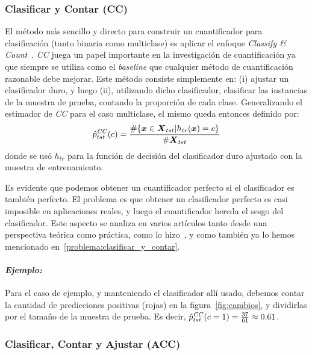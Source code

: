 \subsubsection{Clasificar y Contar (CC)}\label{puntual:cc}

El método más sencillo y directo para construir un cuantificador para
clasificación (tanto binaria como multiclase) es aplicar el enfoque {\it
Classify \& Count\/}~\cite{forman2005counting}. {\it CC\/} juega un papel
importante en la investigación de cuantificación ya que siempre se utiliza como
el {\it baseline\/} que cualquier método de cuantificación razonable debe
mejorar. Este método consiste simplemente en: (i) ajustar un clasificador duro,
y luego (ii), utilizando dicho clasificador, clasificar las instancias de la
muestra de prueba, contando la proporción de cada clase. Generalizando el
estimador de {\it CC\/} para el caso multiclase, el mismo queda entonces
definido por:
\begin{equation}
    \hat p^{\it CC\/}_{tst}(c) = \frac{\#\{\boldsymbol{x} \in \boldsymbol{X}_{tst}|h_{tr}(\boldsymbol{x})=c\}}{\#\boldsymbol{X}_{tst}}\label{ecuacion:cc}
\end{equation}
donde se usó $h_{tr}$ para la función de decisión del clasificador duro ajustado
con la muestra de entrenamiento.

Es evidente que podemos obtener un cuantificador perfecto si el clasificador es
también perfecto. El problema es que obtener un clasificador perfecto es casi
imposible en aplicaciones reales, y luego el cuantificador hereda el sesgo del
clasificador. Este aspecto se analiza en varios artículos tanto desde una
perspectiva teórica como práctica, como lo hizo~\citet{forman2008quantifying}, y
como también ya lo hemos mencionado en~\ref{problema:clasificar_y_contar}.

\paragraph{\it Ejemplo:\/} Para el caso de ejemplo, y manteniendo el
clasificador allí usado, debemos contar la cantidad de predicciones positivas
(rojas) en la figura~\ref{fig:cambios}, y dividirlas por el tamaño de la muestra
de prueba. Es decir, $\hat p^{\it CC\/}_{tst}(c=1) = \frac{37}{61} \approx
0.61$.

\subsubsection{Clasificar, Contar y Ajustar (ACC)}\label{puntual:acc}


